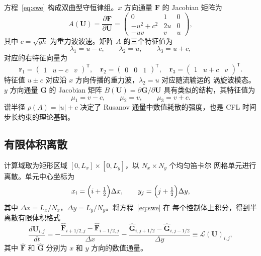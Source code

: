\documentclass[12pt,a4paper]{article}
\newcommand{\U}{\bm{U}}
\newcommand{\F}{\bm{F}}
\newcommand{\G}{\bm{G}}
\newcommand{\T}{^{\mathsf T}}
\begin{document}
方程~\eqref{eq:swe} 构成双曲型守恒律组。$x$ 方向通量 $\F$ 的 Jacobian 矩阵为
\begin{equation}
  A(\U) = \frac{\partial\F}{\partial\U}
  =
  \begin{pmatrix}
    0 & 1 & 0 \\
    -u^2 + c^2 & 2u & 0 \\
    -uv & v & u
  \end{pmatrix},
  \label{eq:jacobian-x}
\end{equation}
其中 $c = \sqrt{gh}$ 为重力波波速。矩阵 $A$ 的三个特征值为
\begin{equation}
  \lambda_1 = u - c,\qquad
  \lambda_2 = u,\qquad
  \lambda_3 = u + c,
  \label{eq:eigen-x}
\end{equation}
对应的右特征向量为
\begin{equation}
  \bm{r}_1 = \begin{pmatrix}1 & u-c & v\end{pmatrix}\T,\quad
  \bm{r}_2 = \begin{pmatrix}0 & 0 & 1\end{pmatrix}\T,\quad
  \bm{r}_3 = \begin{pmatrix}1 & u+c & v\end{pmatrix}\T.
  \label{eq:eigenvec-x}
\end{equation}
特征值 $u\pm c$ 对应沿 $x$ 方向传播的重力波，$\lambda_2 = u$ 对应随流输运的
涡旋波模态。$y$ 方向通量 $\G$ 的 Jacobian 矩阵 $B(\U) = \partial\G/\partial\U$
具有类似的结构，其特征值为
\begin{equation}
  \mu_1 = v - c,\qquad
  \mu_2 = v,\qquad
  \mu_3 = v + c.
  \label{eq:eigen-y}
\end{equation}
谱半径 $\rho(A) = |u| + c$ 决定了 Rusanov 通量中数值耗散的强度，也是 CFL
时间步长约束的理论基础。

\subsection{有限体积离散}

计算域取为矩形区域 $[0, L_x] \times [0, L_y]$，以 $N_x \times N_y$ 个均匀笛卡尔
网格单元进行离散。单元中心坐标为
\[
  x_i = \Bigl(i + \tfrac{1}{2}\Bigr)\Delta x,\qquad
  y_j = \Bigl(j + \tfrac{1}{2}\Bigr)\Delta y,
\]
其中 $\Delta x = L_x/N_x$，$\Delta y = L_y/N_y$。将方程~\eqref{eq:swe} 在
每个控制体上积分，得到半离散有限体积格式
\begin{equation}
  \frac{d\U_{i,j}}{dt}
  =
  -\frac{\widehat{\F}_{i+1/2,j} - \widehat{\F}_{i-1/2,j}}{\Delta x}
  -\frac{\widehat{\G}_{i,j+1/2} - \widehat{\G}_{i,j-1/2}}{\Delta y}
  \equiv \mathcal{L}(\U)_{i,j},
  \label{eq:semidiscrete}
\end{equation}
其中 $\widehat{\F}$ 和 $\widehat{\G}$ 分别为 $x$ 和 $y$ 方向的数值通量。
\end{document}
